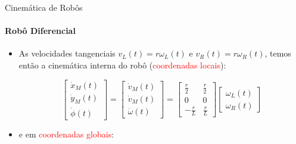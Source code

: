 \documentclass[aspectratio=169]{beamer}
\begin{document}
\begin{frame}{Cinemática de Robôs}
    \framesubtitle{Robô Diferencial}
    \begin{itemize}
        \item As velocidades tangenciais $v_L(t)=r\omega_L(t)$ e $v_R(t)=r\omega_R(t)$, temos então a cinemática interna do robô (\textcolor{red}{coordenadas locais}):

              \begin{equation*}
                  \boxed{
                      \begin{bmatrix}
                          \dot{x}_M(t) \\
                          \dot{y}_M(t) \\
                          \dot{\phi}(t)
                      \end{bmatrix}
                      =
                      \begin{bmatrix}
                          \dot{v}_M(t) \\
                          \dot{v}_M(t) \\
                          \dot{\omega}(t)
                      \end{bmatrix}
                      =
                      \begin{bmatrix}
                          \frac{r}{2}  & \frac{r}{2} \\
                          0            & 0           \\
                          -\frac{r}{L} & \frac{r}{L}
                      \end{bmatrix}
                      \begin{bmatrix}
                          \omega_L(t) \\
                          \omega_R(t)
                      \end{bmatrix}}
              \end{equation*}

        \item e em \textcolor{red}{coordenadas globais}:


\end{itemize}
\end{frame}
\end{document}
